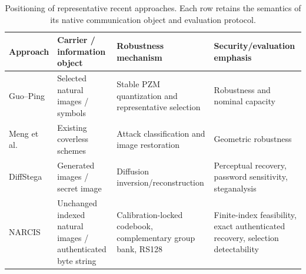 \begin{table}[t]
\caption{Positioning of representative recent approaches. Each row retains the semantics of its native communication object and evaluation protocol.}
\label{tab:positioning}
\small
\begin{tabularx}{\textwidth}{@{}lXXX@{}}
\toprule
Approach & Carrier / information object & Robustness mechanism & Security/evaluation emphasis \\
\midrule
Guo--Ping \cite{guo2026capacity} & Selected natural images / symbols & Stable PZM quantization and representative selection & Robustness and nominal capacity \\
Meng et al. \cite{meng2025restoration} & Existing coverless schemes & Attack classification and image restoration & Geometric robustness \\
DiffStega \cite{yang2024diffstega} & Generated images / secret image & Diffusion inversion/reconstruction & Perceptual recovery, password sensitivity, steganalysis \\
NARCIS & Unchanged indexed natural images / authenticated byte string & Calibration-locked codebook, complementary group bank, RS128 & Finite-index feasibility, exact authenticated recovery, selection detectability \\
\bottomrule
\end{tabularx}
\end{table}
